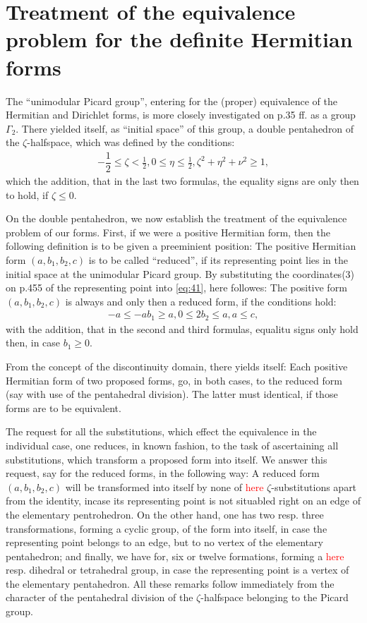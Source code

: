 \section{Treatment of the equivalence problem for the definite Hermitian forms}

The “unimodular Picard group”, entering for the (proper) equivalence of the Hermitian and Dirichlet forms, is more closely investigated on p.35 ff. as a group $\Gamma_2$. There yielded itself, as “initial space” of this group, a double pentahedron of the $\zeta$-halfspace, which was defined by the conditions:
\begin{align}\label{eq:41}
	-\dfrac{1}{2}\leq \zeta <\frac{1}{2}, 0\leq\eta\leq\frac{1}{2}, \zeta^2+\eta^2+\nu^2\geq 1,
\end{align}
which the addition, that in the last two formulas, the equality signs are only then to hold, if $\zeta\leq 0$.

On the double pentahedron, we now establish the treatment of the equivalence problem of our forms.
First, if we were a positive Hermitian form, then the following definition is to be given a preeminient position: The positive Hermitian form $(a,b_1,b_2,c)$ is to be called “reduced”, if its representing point lies in the initial space at the unimodular Picard group. By substituting the coordinates(3) on p.455 of the representing point into \ref{eq:41}, here followes: The positive form $(a,b_1,b_2,c)$ is always and only then a reduced form, if the conditions hold:
\begin{align}\label{eq:42}
	-a\leq -ab_1\geq a, 0\leq 2b_2\leq a, a\leq c,
\end{align}
with the addition, that in the second and third formulas, equalitu signs only hold then, in case $b_1\geq 0$.

From the concept of the discontinuity domain, there yields itself: Each positive Hermitian form of two proposed forms, go, in both cases, to the reduced form (say with use of the pentahedral division). The latter must identical, if those forms are to be equivalent.

The request for all the substitutions, which effect the equivalence in the individual case, one reduces, in known fashion, to the task of ascertaining all substitutions, which transform a proposed form into itself. We answer this request, say for the reduced forms, in the following way: A reduced form $(a,b_1,b_2,c)$ will be transformed into itself by none of \textcolor{red}{here} $\zeta$-substitutions apart from the identity, incase its representing point is not situabled right on an edge of the elementary pentrohedron. On the other hand, one has two resp. three transformations, forming a cyclic group, of the form into itself, in case the representing point belongs to an edge, but to no vertex of the elementary pentahedron; and finally, we have for, six or twelve formations, forming a \textcolor{red}{here} resp. dihedral or tetrahedral group, in case the representing point is a vertex of the elementary pentahedron. All these remarks follow immediately from the character of the pentahedral division of the $\zeta$-halfspace belonging to the Picard group.

